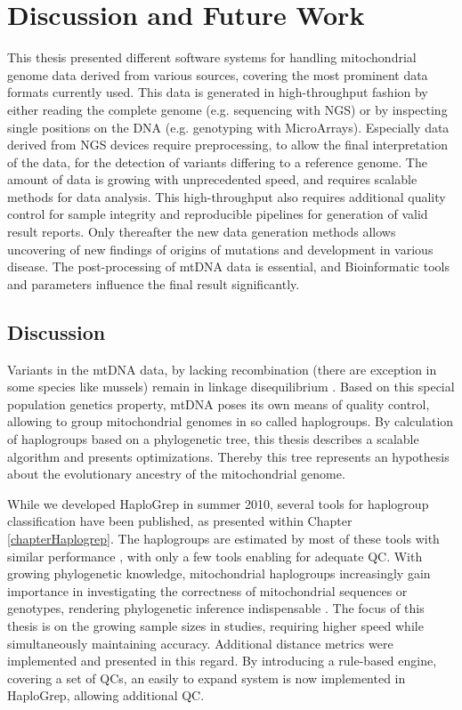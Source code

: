 \chapter{Discussion and Future Work}
\label{outlook}

This thesis presented different software systems for handling mitochondrial genome data derived from various sources, covering the most prominent data formats currently used. This data is generated in high-throughput fashion by either reading the complete genome (e.g. sequencing with NGS) or by inspecting single positions on the DNA (e.g. genotyping with MicroArrays). Especially data derived from NGS devices require preprocessing, to allow the final interpretation of the data, for the detection of variants differing to a reference genome. The amount of data is growing with unprecedented speed, and requires scalable methods for data analysis. This high-throughput also requires additional quality control for sample integrity and reproducible pipelines for generation of valid result reports. Only thereafter the new data generation methods allows uncovering of new findings of origins of mutations and development in various disease. The post-processing of mtDNA data is essential, and Bioinformatic tools and parameters influence the final result significantly. 
\section{Discussion}
\label{disc:sec1}
Variants in the mtDNA data, by lacking recombination (there are exception in some species like mussels) remain in linkage disequilibrium \cite{Wallace2013}. Based on this special population genetics property, mtDNA poses its own means of quality control, allowing to group mitochondrial genomes in so called haplogroups. By calculation of haplogroups based on a phylogenetic tree, this thesis describes a scalable algorithm and presents optimizations.  Thereby this tree represents an hypothesis about the evolutionary ancestry of the mitochondrial genome. 

While we developed HaploGrep in summer 2010, several tools for haplogroup classification  have been published, as presented within Chapter \ref{chapterHaplogrep}. The haplogroups are estimated by most of these tools with similar performance \cite{Bandelt2012}, with only a few tools enabling for adequate QC. With growing phylogenetic knowledge, mitochondrial haplogroups increasingly gain importance in investigating the correctness of mitochondrial sequences or genotypes, rendering phylogenetic inference indispensable \cite{Weissensteiner2016a}. The focus of this thesis is on the growing sample sizes in studies, requiring higher speed while simultaneously maintaining accuracy. 
Additional distance metrics were implemented and presented in this regard. By introducing a rule-based engine, covering a set of QCs, an easily to expand system is now implemented in HaploGrep, allowing additional QC. 

